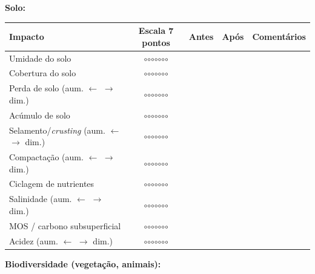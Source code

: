\textbf{Solo:}

{
\begin{longtable}[]{@{}lcccl@{}}
\toprule\noalign{}
Impacto & Escala 7 pontos & Antes & Após & Comentários \\
\midrule\noalign{}
\endhead
\bottomrule\noalign{}
\endlastfoot
Umidade do solo & $\circ$$\circ$$\circ$$\circ$$\circ$$\circ$$\circ$ & & & \\
Cobertura do solo & $\circ$$\circ$$\circ$$\circ$$\circ$$\circ$$\circ$ & & & \\
Perda de solo (aum. $\leftarrow$ $\rightarrow$ dim.) & $\circ$$\circ$$\circ$$\circ$$\circ$$\circ$$\circ$ & & & \\
Acúmulo de solo & $\circ$$\circ$$\circ$$\circ$$\circ$$\circ$$\circ$ & & & \\
Selamento/\emph{crusting} (aum. $\leftarrow$ $\rightarrow$ dim.) & $\circ$$\circ$$\circ$$\circ$$\circ$$\circ$$\circ$ & & & \\
Compactação (aum. $\leftarrow$ $\rightarrow$ dim.) & $\circ$$\circ$$\circ$$\circ$$\circ$$\circ$$\circ$ & & & \\
Ciclagem de nutrientes & $\circ$$\circ$$\circ$$\circ$$\circ$$\circ$$\circ$ & & & \\
Salinidade (aum. $\leftarrow$ $\rightarrow$ dim.) & $\circ$$\circ$$\circ$$\circ$$\circ$$\circ$$\circ$ & & & \\
MOS / carbono subsuperficial & $\circ$$\circ$$\circ$$\circ$$\circ$$\circ$$\circ$ & & & \\
Acidez (aum. $\leftarrow$ $\rightarrow$ dim.) & $\circ$$\circ$$\circ$$\circ$$\circ$$\circ$$\circ$ & & & \\
\end{longtable}
}

\textbf{Biodiversidade (vegetação, animais):}

